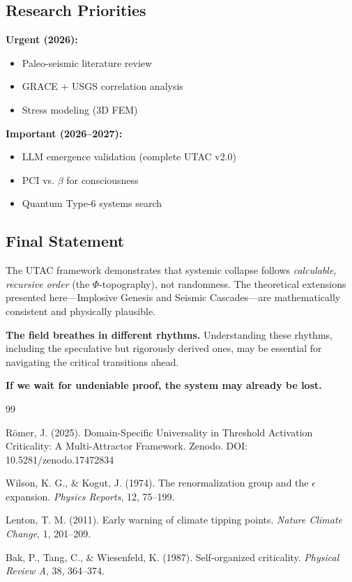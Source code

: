 \documentclass[11pt,a4paper]{article}
\begin{document}
\subsection{Research Priorities}

\textbf{Urgent (2026):}
\begin{itemize}
\item Paleo-seismic literature review
\item GRACE + USGS correlation analysis
\item Stress modeling (3D FEM)
\end{itemize}

\textbf{Important (2026--2027):}
\begin{itemize}
\item LLM emergence validation (complete UTAC v2.0)
\item PCI vs. $\beta$ for consciousness
\item Quantum Type-6 systems search
\end{itemize}

\subsection{Final Statement}

The UTAC framework demonstrates that systemic collapse follows \textit{calculable, recursive order} (the $\Phi$-topography), not randomness. The theoretical extensions presented here—Implosive Genesis and Seismic Cascades—are mathematically consistent and physically plausible.

\textbf{The field breathes in different rhythms.} Understanding these rhythms, including the speculative but rigorously derived ones, may be essential for navigating the critical transitions ahead.

\textbf{If we wait for undeniable proof, the system may already be lost.}


\begin{thebibliography}{99}

Römer, J. (2025). Domain-Specific Universality in Threshold Activation Criticality: A Multi-Attractor Framework. Zenodo. DOI: 10.5281/zenodo.17472834

Wilson, K. G., \& Kogut, J. (1974). The renormalization group and the $\epsilon$ expansion. \textit{Physics Reports}, 12, 75--199.

Lenton, T. M. (2011). Early warning of climate tipping points. \textit{Nature Climate Change}, 1, 201--209.

Bak, P., Tang, C., \& Wiesenfeld, K. (1987). Self-organized criticality. \textit{Physical Review A}, 38, 364--374.

\end{thebibliography}
\end{document}
